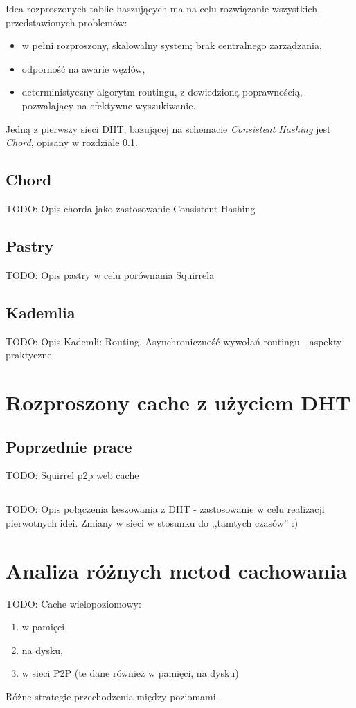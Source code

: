 \documentclass[a4paper,11pt]{scrartcl}
\newcommand{\s}{ }
\newcommand{\kesz}{cache}
\begin{document}
Idea rozproszonych tablic haszujących ma na celu rozwiązanie wszystkich przedstawionych problemów:
\begin{itemize}
  \item w pełni rozproszony, skalowalny system; brak centralnego zarządzania,
  \item odporność na awarie węzłów,
  \item deterministyczny algorytm routingu, z dowiedzioną poprawnością, pozwalający na efektywne wyszukiwanie. 
\end{itemize} 

Jedną z pierwszy sieci DHT, bazującej na schemacie \textit{Consistent Hashing} jest \textit{Chord}, opisany w rozdziale \ref{sect_dht_chord}.

\subsection{Chord}
\label{sect_dht_chord}
TODO: Opis chorda jako zastosowanie Consistent Hashing

\subsection{Pastry}
TODO: Opis pastry w celu porównania Squirrela
 
\subsection{Kademlia}
TODO: Opis Kademli\cite{maymounkov2002kademlia}: Routing, Asynchroniczność wywołań routingu - aspekty praktyczne.

\section{Rozproszony \kesz\s z użyciem DHT}

\subsection{Poprzednie prace}
TODO: Squirrel p2p web cache \cite{iyer2002squirrel}

\subsection{}
TODO: Opis połączenia keszowania z DHT - zastosowanie w celu realizacji pierwotnych idei. Zmiany w sieci w stosunku do ,,tamtych czasów'' :)

\section{Analiza różnych metod cachowania}
TODO:
Cache wielopoziomowy:
\begin{enumerate}
  \item w pamięci,
  \item na dysku,
  \item w sieci P2P (te dane również w pamięci, na dysku)
\end{enumerate}
Różne strategie przechodzenia między poziomami.
\end{document}
